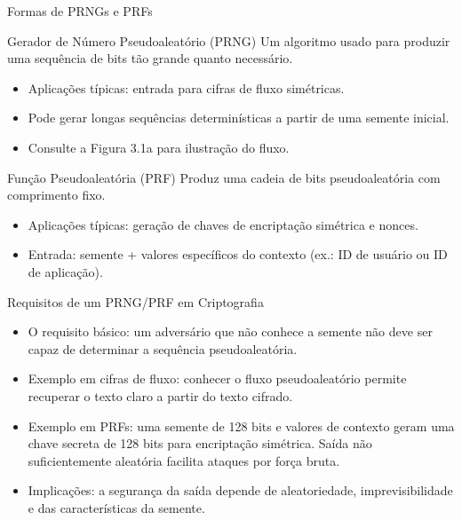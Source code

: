 \begin{frame}{Formas de PRNGs e PRFs}
\begin{block}{Gerador de Número Pseudoaleatório (PRNG)}
Um algoritmo usado para produzir uma sequência de bits tão grande quanto necessário.  
\begin{itemize}
    \item Aplicações típicas: entrada para cifras de fluxo simétricas.
    \item Pode gerar longas sequências determinísticas a partir de uma semente inicial.
    \item Consulte a Figura 3.1a para ilustração do fluxo.
\end{itemize}
\end{block}

\begin{block}{Função Pseudoaleatória (PRF)}
Produz uma cadeia de bits pseudoaleatória com comprimento fixo.  
\begin{itemize}
    \item Aplicações típicas: geração de chaves de encriptação simétrica e nonces.
    \item Entrada: semente + valores específicos do contexto (ex.: ID de usuário ou ID de aplicação).
\end{itemize}
\end{block}
\end{frame}

\begin{frame}{Requisitos de um PRNG/PRF em Criptografia}
\begin{itemize}
    \item O requisito básico: um adversário que não conhece a semente não deve ser capaz de determinar a sequência pseudoaleatória.
    \item Exemplo em cifras de fluxo: conhecer o fluxo pseudoaleatório permite recuperar o texto claro a partir do texto cifrado.
    \item Exemplo em PRFs: uma semente de 128 bits e valores de contexto geram uma chave secreta de 128 bits para encriptação simétrica. Saída não suficientemente aleatória facilita ataques por força bruta.
    \item Implicações: a segurança da saída depende de aleatoriedade, imprevisibilidade e das características da semente.
\end{itemize}
\end{frame}

